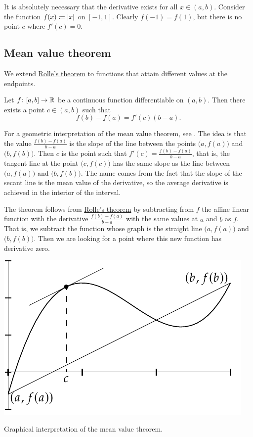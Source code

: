 It is absolutely necessary that the derivative exists for all $x
\in (a,b)$.  Consider the function $f(x) \coloneqq \left\lvert {x} \right\rvert$ on $[-1,1]$.
Clearly $f(-1) = f(1)$, but there is no point $c$ where $f'(c) = 0$.

\subsection{Mean value theorem}

We extend \hyperref[thm:rolle]{Rolle's theorem}
to functions that attain different
values at the endpoints.

\begin{thm} \label{thm:mvt}
Let $f \colon [a,b] \to {\mathbb{R}}$ be a continuous function
differentiable on $(a,b)$.  Then there exists a point $c \in (a,b)$
such that
\begin{equation*}
f(b)-f(a) = f'(c)(b-a) .
\end{equation*}
\end{thm}

For a geometric interpretation of the mean value theorem, see
.  The idea is that the value $\frac{f(b)-f(a)}{b-a}$
is the slope of the line between the points $\bigl(a,f(a)\bigr)$
and $\bigl(b,f(b)\bigr)$.
Then $c$ is the point such that $f'(c) = \frac{f(b)-f(a)}{b-a}$, that 
is, the tangent line at the point $\bigl(c,f(c)\bigr)$ has the same slope as the
line between $\bigl(a,f(a)\bigr)$ and $\bigl(b,f(b)\bigr)$.
The name comes from the fact that the slope of the secant line
is the mean value of the derivative, so the average derivative is achieved
in the interior of the interval.

The theorem follows from \hyperref[thm:rolle]{Rolle's theorem}
by subtracting from $f$ the affine linear function with the derivative
$\frac{f(b)-f(a)}{b-a}$ with the same values at $a$ and $b$ as $f$.
That is, we subtract the function whose graph is the straight line
$\bigl(a,f(a)\bigr)$ and $\bigl(b,f(b)\bigr)$.
Then we are looking for a point where this new
function has derivative zero.

\begin{myfigureht}
\includegraphics{figures/mvtfig}
\caption{Graphical interpretation of the mean value theorem.\label{mvtfig}}
\end{myfigureht}


